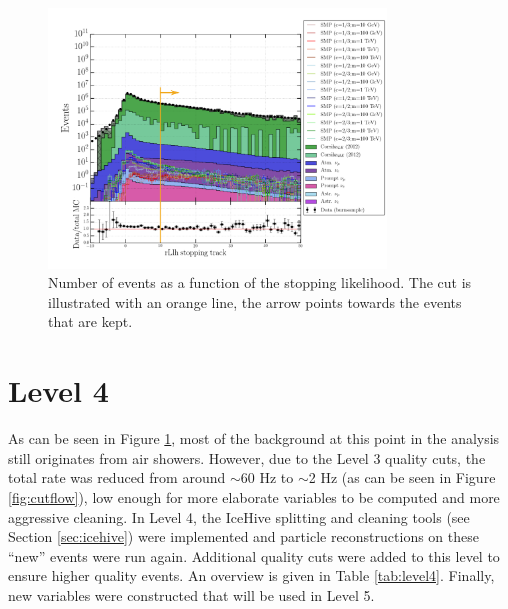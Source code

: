 \begin{figure}[t]
\centering
\includegraphics[width=0.8\textwidth]{chapter8/img/1D_stack_finitereco_rllh_stopping_final.png}
\caption{Number of events as a function of the stopping likelihood. The cut is illustrated with an orange line, the arrow points towards the events that are kept.}
\label{fig:level3stopping}
\end{figure}

\section{Level 4}
As can be seen in Figure \ref{fig:level3stopping}, most of the background at this point in the analysis still originates from air showers. However, due to the Level 3 quality cuts, the total rate was reduced from around $\sim$60 Hz to $\sim$2 Hz (as can be seen in Figure \ref{fig:cutflow}), low enough for more elaborate variables to be computed and more aggressive cleaning. In Level 4, the IceHive splitting and cleaning tools (see Section \ref{sec:icehive}) were implemented and particle reconstructions on these ``new'' events were run again. Additional quality cuts were added to this level to ensure higher quality events. An overview is given in Table \ref{tab:level4}. Finally, new variables were constructed that will be used in Level 5.

